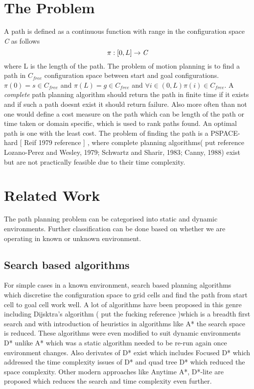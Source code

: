 \documentclass[MTech]{iitmdiss}
\begin{document}
\section{The Problem}

A path is defined as a continuous function with range in the configuration space \emph{C} as follows $$\pi:[0,L] \rightarrow \emph{C}$$  where L is the length of the path. The problem of motion planning is to find a path in \emph{$C_{free}$} configuration space between start and goal configurations. 
$\pi(0) = s \in C_{free}$ and $\pi(L) = g \in C_{free}$ and $\forall i \in (0,L) \pi(i) \in C_{free} $.
A \emph{complete} path planning algorithm should return the path in finite time if it exists and if such a path doesnt exist it should return failure. Also more often than not one would define a cost measure on the path which can be length of the path or time taken or domain specific, which is used to rank paths found. An optimal path is one with the least cost. The problem of finding the path is a PSPACE-hard [ Reif 1979 reference ] , where complete planning algorithms( put reference Lozano-Perez and Wesley, 1979; Schwartz and Sharir, 1983; Canny, 1988) exist but are not practically feasible due to their time complexity.  
\section{Related Work}
The path planning problem can be categorised into static and dynamic environments. Further classification can be done based on whether we are operating in known or unknown environment. 
\subsection{Search based algorithms}
For simple cases in a known environment, search based planning algorithms which discretise the configuration space to grid cells and find the path from start cell to goal cell work well. A lot of algorithms have been proposed in this genre including Dijsktra's algorithm ( put the fucking reference )which is a breadth first search and with introduction of heuristics in algorithms like A* the search space is reduced. These algorithms were even modified to suit dynamic environments D* unlike A* which was a static algorithm needed to be re-run again once environment changes. Also derivates of D* exist which includes Focused D* which addressed the time complexity issues of D*  and quad tree D* which reduced the space complexity. Other modern approaches like Anytime A*, D*-lite are proposed which reduces the search and time complexity even further.
\end{document}
